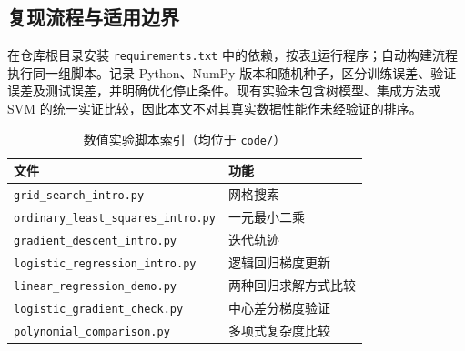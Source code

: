 \subsection{复现流程与适用边界}
在仓库根目录安装 \texttt{requirements.txt} 中的依赖，按表\ref{tab:script-index}运行程序；自动构建流程执行同一组脚本。记录 Python、NumPy 版本和随机种子，区分训练误差、验证误差及测试误差，并明确优化停止条件。现有实验未包含树模型、集成方法或 SVM 的统一实证比较，因此本文不对其真实数据性能作未经验证的排序。

\begin{table}[htbp]\centering
\caption{数值实验脚本索引（均位于 \texttt{code/}）}\label{tab:script-index}
\begin{tabularx}{\textwidth}{p{83mm}X}\toprule
文件 & 功能\\\midrule
\texttt{grid\_search\_intro.py} & 网格搜索\\
\texttt{ordinary\_least\_squares\_intro.py} & 一元最小二乘\\
\texttt{gradient\_descent\_intro.py} & 迭代轨迹\\
\texttt{logistic\_regression\_intro.py} & 逻辑回归梯度更新\\
\texttt{linear\_regression\_demo.py} & 两种回归求解方式比较\\
\texttt{logistic\_gradient\_check.py} & 中心差分梯度验证\\
\texttt{polynomial\_comparison.py} & 多项式复杂度比较\\\bottomrule
\end{tabularx}
\end{table}
